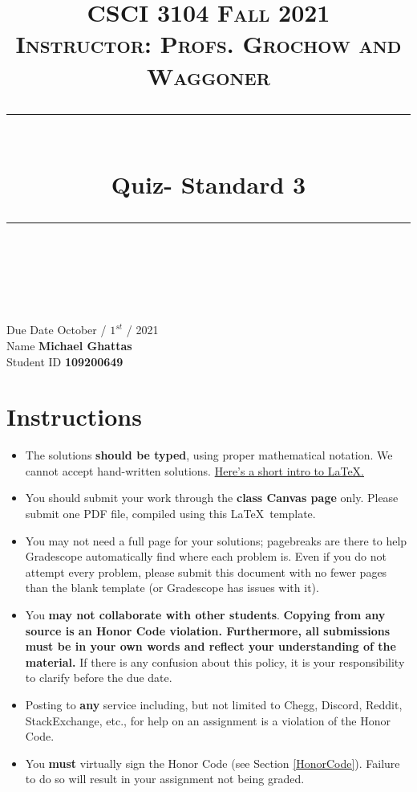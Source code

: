 \documentclass[11pt]{article}
\title{
\normalfont \normalsize 
\textsc{CSCI 3104 Fall 2021 \\ 
Instructor: Profs. Grochow and Waggoner} \\
[10pt] 
\rule{\linewidth}{0.5pt} \\[6pt] 
\huge Quiz- Standard 3 \\
\rule{\linewidth}{2pt}  \\[10pt]
}
\date{}
\theoremstyle{definition}
\theoremstyle{definition}
\theoremstyle{definition}
\begin{document}
\maketitle


\noindent
Due Date \dotfill October / $1^{st}$ / 2021 \\
Name \dotfill \textbf{Michael Ghattas} \\
Student ID \dotfill \textbf{109200649} \\


\tableofcontents

\section{Instructions}
 \begin{itemize}
	\item The solutions \textbf{should be typed}, using proper mathematical notation. We cannot accept hand-written solutions. \href{http://ece.uprm.edu/~caceros/latex/introduction.pdf}{Here's a short intro to \LaTeX.}
	\item You should submit your work through the \textbf{class Canvas page} only. Please submit one PDF file, compiled using this \LaTeX \ template.
	\item You may not need a full page for your solutions; pagebreaks are there to help Gradescope automatically find where each problem is. Even if you do not attempt every problem, please submit this document with no fewer pages than the blank template (or Gradescope has issues with it).

	\item You \textbf{may not collaborate with other students}. \textbf{Copying from any source is an Honor Code violation. Furthermore, all submissions must be in your own words and reflect your understanding of the material.} If there is any confusion about this policy, it is your responsibility to clarify before the due date. 

	\item Posting to \textbf{any} service including, but not limited to Chegg, Discord, Reddit, StackExchange, etc., for help on an assignment is a violation of the Honor Code.

	\item You \textbf{must} virtually sign the Honor Code (see Section \ref{HonorCode}). Failure to do so will result in your assignment not being graded.
\end{itemize}
\end{document}
